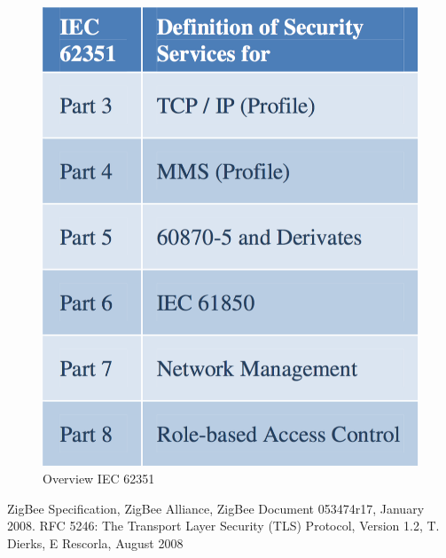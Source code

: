 \begin{figure}[h]
	\centering
	\includegraphics[scale=0.350]{imgs/62351.png}
	\caption{Overview IEC 62351} \label{fig:62351}
\end{figure}



\begin{thebibliography}{99}
 ZigBee Specification, ZigBee Alliance, ZigBee Document 053474r17, January 2008.
 RFC 5246: The Transport Layer Security (TLS) Protocol, Version 1.2, T. Dierks, E Rescorla, August 2008
\end{thebibliography}